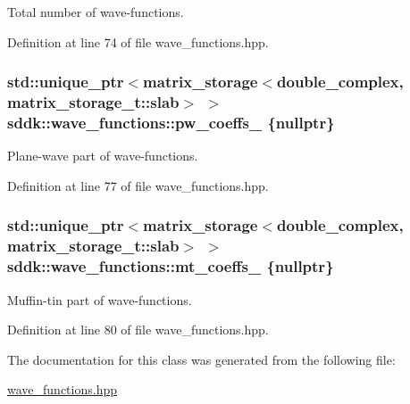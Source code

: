 Total number of wave-\/functions. 



Definition at line 74 of file wave\+\_\+functions.\+hpp.

\hypertarget{classsddk_1_1wave__functions_ab9f23505c1321afdc8adf023b9631b55}{}
\subsubsection[{pw\+\_\+coeffs\+\_\+}]{\setlength{\rightskip}{0pt plus 5cm}std\+::unique\+\_\+ptr$<${\bf matrix\+\_\+storage}$<$double\+\_\+complex, matrix\+\_\+storage\+\_\+t\+::slab$>$ $>$ sddk\+::wave\+\_\+functions\+::pw\+\_\+coeffs\+\_\+ \{nullptr\}\hspace{0.3cm}{\ttfamily [private]}}\label{classsddk_1_1wave__functions_ab9f23505c1321afdc8adf023b9631b55}


Plane-\/wave part of wave-\/functions. 



Definition at line 77 of file wave\+\_\+functions.\+hpp.

\hypertarget{classsddk_1_1wave__functions_ae32793eca8637e1e616072311f1b2647}{}
\subsubsection[{mt\+\_\+coeffs\+\_\+}]{\setlength{\rightskip}{0pt plus 5cm}std\+::unique\+\_\+ptr$<${\bf matrix\+\_\+storage}$<$double\+\_\+complex, matrix\+\_\+storage\+\_\+t\+::slab$>$ $>$ sddk\+::wave\+\_\+functions\+::mt\+\_\+coeffs\+\_\+ \{nullptr\}\hspace{0.3cm}{\ttfamily [private]}}\label{classsddk_1_1wave__functions_ae32793eca8637e1e616072311f1b2647}


Muffin-\/tin part of wave-\/functions. 



Definition at line 80 of file wave\+\_\+functions.\+hpp.



The documentation for this class was generated from the following file\+:\begin{DoxyCompactItemize}
\item 
\hyperlink{wave__functions_8hpp}{wave\+\_\+functions.\+hpp}\end{DoxyCompactItemize}

